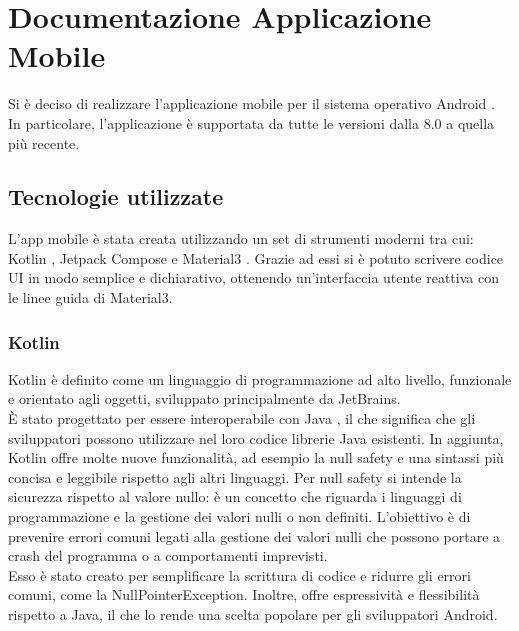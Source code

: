 \documentclass[a4paper,final,12pt]{report}
\begin{document}
\chapter{Documentazione Applicazione Mobile} Si è deciso di realizzare l'applicazione mobile per il sistema operativo Android \cite{Android}. In particolare, l'applicazione è supportata da tutte le versioni dalla 8.0 a quella più recente.

\section{Tecnologie utilizzate}
 L'app mobile è stata creata utilizzando un set di strumenti moderni tra cui: Kotlin \cite{Kotlin}, Jetpack Compose \cite{Compose} e Material3 \cite{Material}. Grazie ad essi si è potuto scrivere codice UI in modo semplice e dichiarativo, ottenendo un'interfaccia utente reattiva con le linee guida di Material3.

 \subsection{Kotlin}
 Kotlin è definito come un linguaggio di programmazione ad alto livello, funzionale e orientato agli oggetti, sviluppato principalmente da JetBrains.\\

 È stato progettato per essere interoperabile con Java \cite{Java}, il che significa che gli sviluppatori possono utilizzare nel loro codice librerie Java esistenti. In aggiunta, Kotlin offre molte nuove funzionalità, ad esempio la null safety e una sintassi più concisa e leggibile rispetto agli altri linguaggi. Per null safety si intende la sicurezza rispetto al valore nullo: è un concetto che riguarda i linguaggi di programmazione e la gestione dei valori nulli o non definiti. L'obiettivo è di prevenire errori comuni legati alla gestione dei valori nulli che possono portare a crash del programma o a comportamenti imprevisti.\\

Esso è stato creato per semplificare la scrittura di codice e ridurre gli errori comuni, come la NullPointerException. Inoltre, offre espressività e flessibilità rispetto a Java, il che lo rende una scelta popolare per gli sviluppatori Android.
\end{document}

